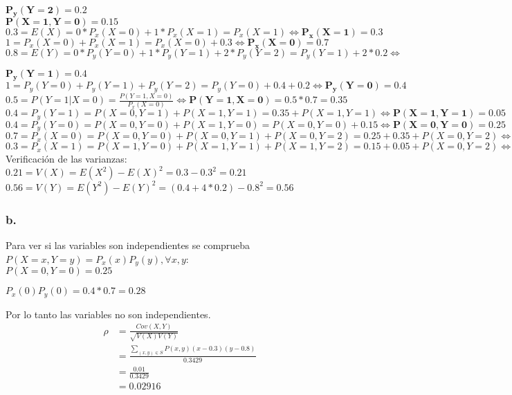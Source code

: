 \documentclass[12pt,fleqn]{article}
\begin{document}
$\mathbf{P_y(Y=2)=0.2}$\\

$\mathbf{P(X=1,Y=0)=0.15}$\\

$0.3=E(X)=0*P_x(X=0)+1*P_x(X=1)=P_x(X=1)\iff \mathbf{P_x(X=1)=0.3}$\\

$1=P_x(X=0)+P_x(X=1)=P_x(X=0)+0.3\iff \mathbf{P_x(X=0)=0.7}$\\

$0.8=E(Y)=0*P_y(Y=0)+1*P_y(Y=1)+2*P_y(Y=2)=P_y(Y=1)+2*0.2\iff$

$\mathbf{P_y(Y=1)=0.4}$\\

$1=P_y(Y=0)+P_y(Y=1)+P_y(Y=2)=P_y(Y=0)+0.4+0.2\iff \mathbf{P_y(Y=0)=0.4}$\\

$0.5=P(Y=1|X=0)=\frac{P(Y=1,X=0)}{P_x(X=0)}\iff \mathbf{P(Y=1,X=0)=0.5*0.7=0.35}$\\

$0.4=P_y(Y=1)=P(X=0,Y=1)+P(X=1,Y=1)=0.35+P(X=1,Y=1)\iff \mathbf{P(X=1,Y=1)=0.05}$\\

$0.4=P_y(Y=0)=P(X=0,Y=0)+P(X=1,Y=0)=P(X=0,Y=0)+0.15\iff \mathbf{P(X=0,Y=0)=0.25}$\\

$0.7=P_x(X=0)=P(X=0,Y=0)+P(X=0,Y=1)+P(X=0,Y=2)=0.25+0.35+P(X=0,Y=2)\iff \mathbf{P(X=0,Y=2)=0.1}$\\

$0.3=P_x(X=1)=P(X=1,Y=0)+P(X=1,Y=1)+P(X=1,Y=2)=0.15+0.05+P(X=0,Y=2)\iff \mathbf{P(X=0,Y=2)=0.1}$\\

Verificación de las varianzas:\\

$0.21=V(X)=E(X^2)-E(X)^2=0.3-0.3^2=0.21$\\

$0.56=V(Y)=E(Y^2)-E(Y)^2=(0.4+4*0.2)-0.8^2=0.56$
\newpage
\subsubsection*{b.}
Para ver si las variables son independientes se comprueba $P(X=x,Y=y)=P_x(x)P_y(y),\forall x,y$:\\

$P(X=0,Y=0)=0.25$

$P_x(0)P_y(0)=0.4*0.7=0.28$

Por lo tanto las variables no son independientes.\\
\begin{align*}
  \rho&=\frac{Cov(X,Y)}{\sqrt{V(X)V(Y)}}\\
      &=\frac{\sum_{(x,y)\in S}P(x,y)(x-0.3)(y-0.8)}{0.3429}\tag{Covarianza de variables discretas}\\
      &=\frac{0.01}{0.3429}\\
      &=0.02916
\end{align*}
\end{document}
